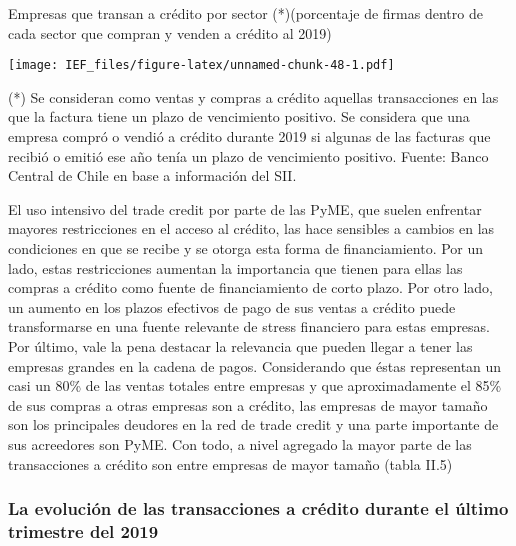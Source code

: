\documentclass[
]{book}
\begin{document}
Empresas que transan a crédito por sector (*)(porcentaje de firmas dentro de cada sector que compran y venden a crédito al 2019)

\texttt{[image: IEF\_files/figure-latex/unnamed-chunk-48-1.pdf]}

(*) Se consideran como ventas y compras a crédito aquellas transacciones en las que la factura tiene un plazo de vencimiento positivo. Se considera que una empresa compró o vendió a crédito durante 2019 si algunas de las facturas que recibió o emitió ese año tenía un plazo de vencimiento positivo.
Fuente: Banco Central de Chile en base a información del SII.

El uso intensivo del trade credit por parte de las PyME, que
suelen enfrentar mayores restricciones en el acceso al crédito,
las hace sensibles a cambios en las condiciones en que se recibe
y se otorga esta forma de financiamiento. Por un lado, estas
restricciones aumentan la importancia que tienen para ellas las
compras a crédito como fuente de financiamiento de corto plazo.
Por otro lado, un aumento en los plazos efectivos de pago de sus
ventas a crédito puede transformarse en una fuente relevante de
stress financiero para estas empresas.
Por último, vale la pena destacar la relevancia que pueden
llegar a tener las empresas grandes en la cadena de pagos.
Considerando que éstas representan un casi un 80\% de las
ventas totales entre empresas y que aproximadamente el 85\%
de sus compras a otras empresas son a crédito, las empresas de
mayor tamaño son los principales deudores en la red de trade
credit y una parte importante de sus acreedores son PyME. Con
todo, a nivel agregado la mayor parte de las transacciones a
crédito son entre empresas de mayor tamaño (tabla II.5)

\hypertarget{REC2.13}{%
\subsubsection*{\texorpdfstring{\textbf{La evolución de las transacciones a crédito durante el último trimestre del 2019}}{La evolución de las transacciones a crédito durante el último trimestre del 2019}}\label{REC2.13}}
\end{document}
